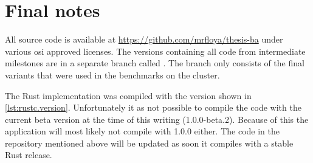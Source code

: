 \chapter{Final notes}
\label{ap:notes}

All source code is available at \url{https://github.com/mrfloya/thesis-ba} under various \gls{osi} approved licenses. The versions containing all code from intermediate milestones are in a separate branch called . The  branch only consists of the final variants that were used in the benchmarks on the cluster.

The Rust implementation was compiled with the version shown in \autoref{lst:rustc.version}. Unfortunately it as not possible to compile the code with the current beta version at the time of this writing (1.0.0-beta.2). Because of this the application will most likely not compile with 1.0.0 either. The code in the repository mentioned above will be updated as soon it compiles with a stable Rust release.
